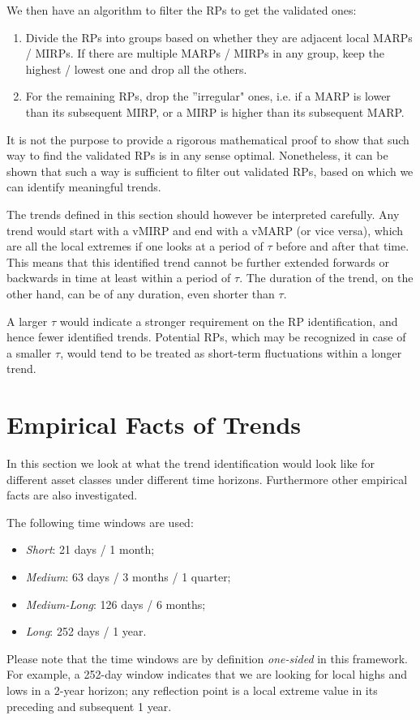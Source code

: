 We then have an algorithm to filter the RPs to get the validated ones: 
\begin{enumerate}
	\item Divide the RPs into groups based on whether they are adjacent local MARPs / MIRPs. If there are multiple MARPs / MIRPs in any group, keep the highest / lowest one and drop all the others. 
	\item For the remaining RPs, drop the ''irregular" ones, i.e. if a MARP is lower than its subsequent MIRP, or a MIRP is higher than its subsequent MARP. 
\end{enumerate}

It is not the purpose to provide a rigorous mathematical proof to show that such way to find the validated RPs is in any sense optimal. Nonetheless, it can be shown that such a way is sufficient to filter out validated RPs, based on which we can identify meaningful trends. 

The trends defined in this section should however be interpreted carefully. Any trend would start with a vMIRP and end with a vMARP (or vice versa), which are all the local extremes if one looks at a period of $\tau$ before and after that time. This means that this identified trend cannot be further extended forwards or backwards in time at least within a period of $\tau$. The duration of the trend, on the other hand, can be of any duration, even shorter than $\tau$. 

A larger $\tau$ would indicate a stronger requirement on the RP identification, and hence fewer identified trends. Potential RPs, which may be recognized in case of a smaller $\tau$, would tend to be treated as short-term fluctuations within a longer trend. 

\section{Empirical Facts of Trends}

In this section we look at what the trend identification would look like for different asset classes under different time horizons. Furthermore other empirical facts are also investigated. 

The following time windows are used:
\begin{itemize}
	\item \textit{Short}: 21 days / 1 month; 
	\item \textit{Medium}: 63 days / 3 months / 1 quarter; 
	\item \textit{Medium-Long}: 126 days / 6 months; 
	\item \textit{Long}: 252 days / 1 year. 
\end{itemize}
Please note that the time windows are by definition \textit{one-sided} in this framework. For example, a 252-day window indicates that we are looking for local highs and lows in a 2-year horizon; any reflection point is a local extreme value in its preceding and subsequent 1 year. 

